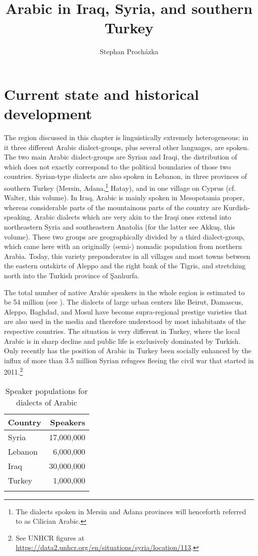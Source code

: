 \documentclass[output=paper]{langsci/langscibook}
\author{Stephan Procházka\affiliation{University of Vienna}}
\title{Arabic in Iraq, Syria, and southern Turkey}
\begin{document}
\section{Current state and historical development}  \label{state} 

The region discussed in this chapter is linguistically extremely heterogeneous: in it three different Arabic dialect-groups, plus several other languages, are spoken. The two main Arabic dialect-groups are Syrian and Iraqi, the distribution of which does not exactly correspond to the political boundaries of those two countries. Syrian-type dialects are also spoken in Lebanon, in three provinces of southern Turkey (Mersin, Adana,\footnote{The dialects spoken in Mersin and Adana provinces will henceforth referred to as Cilician Arabic.} Hatay), and in one village on Cyprus (cf. Walter, this volume). In Iraq, Arabic is mainly spoken in Mesopotamia proper, whereas considerable parts of the mountainous parts of the country are Kurdish-speaking. Arabic dialects which are very akin to the Iraqi ones extend into northeastern Syria and southeastern Anatolia (for the latter see Akkuş, this volume). These two groups are geographically divided by a third dialect-group, which came here with an originally (semi-) nomadic population from northern Arabia. Today, this variety preponderates in all villages and most towns between the eastern outskirts of Aleppo and the right bank of the Tigris, and stretching north into the Turkish province of Şanlıurfa. 

The total number of native Arabic speakers in the whole region is estimated to be 54 million (see ). The dialects of large urban centers like Beirut, Damascus, Aleppo, Baghdad, and Mosul have become supra-regional prestige varieties that are also used in the media and therefore understood by most inhabitants of the respective countries. The situation is very different in Turkey, where the local Arabic is in sharp decline and public life is exclusively dominated by Turkish. Only recently has the position of Arabic in Turkey been socially enhanced by the influx of more than 3.5 million Syrian refugees fleeing the civil war that started in 2011.\footnote{See UNHCR figures at \url{https://data2.unhcr.org/en/situations/syria/location/113}.}

\begin{table}
\begin{tabularx}{.50\textwidth}{Xr}
\lsptoprule
Country & Speakers\\
\midrule
{Syria} &  17,000,000\\
{Lebanon} & 6,000,000\\
{Iraq} &  30,000,000\\
Turkey &  1,000,000\\
\lspbottomrule
\end{tabularx} 
\caption{Speaker populations for dialects of Arabic}
\label{tab:prochazka:1}
\end{table}
\end{document}
